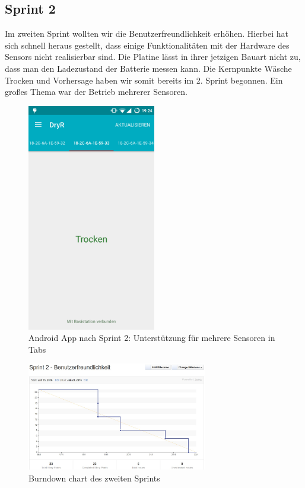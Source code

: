 \subsection{Sprint 2}
Im zweiten Sprint wollten wir die Benutzerfreundlichkeit erhöhen.
Hierbei hat sich schnell heraus gestellt, dass einige Funktionalitäten mit der Hardware des Sensors nicht realisierbar sind. Die Platine lässt in ihrer jetzigen Bauart nicht zu, dass man den Ladezustand der Batterie messen kann. Die Kernpunkte \glqq Wäsche Trocken\grqq{} und \glqq Vorhersage\grqq{} haben wir somit bereits im 2. Sprint begonnen. Ein großes Thema war der Betrieb mehrerer Sensoren.
\begin{figure}[htb] 
	\centerline{\includegraphics[width=0.5\textwidth]{laundry_status_multiple_sensors.png}}
	\caption{Android App nach Sprint 2: Unterstützung für mehrere Sensoren in Tabs}
	\label{screenshot_sprint_2_laundry_status}
\end{figure}
\begin{figure}[htb] 
	\centerline{\includegraphics[width=0.7\textwidth]{burndown_sprint2.jpg}}
	\caption{Burndown chart des zweiten Sprints}
	\label{screenshot_sprint_2_burndown}
\end{figure}
\clearpage

